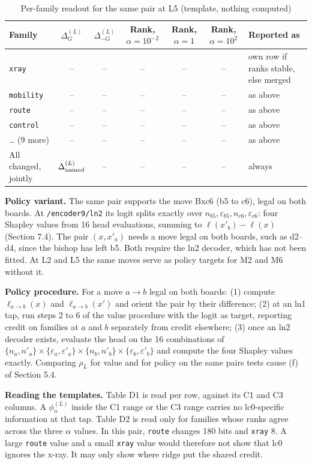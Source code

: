 \documentclass[conference]{IEEEtran}
\begin{document}
\begin{table}[H]
\centering
\renewcommand{\thetable}{D2}
\caption{Per-family readout for the same pair at L5 (template, nothing computed)}
\label{tab:D2}
\small
\begin{tabularx}{\textwidth}{lccccc>{\raggedright\arraybackslash}X}
\toprule
Family & $\Delta^{(L)}_G$ & $\Delta^{(L)}_{-G}$ & Rank, $\alpha=10^{-2}$ & Rank, $\alpha=1$ & Rank, $\alpha=10^{2}$ & Reported as \\
\midrule
\texttt{xray} & -- & -- & -- & -- & -- & own row if ranks stable, else merged \\
\texttt{mobility} & -- & -- & -- & -- & -- & as above \\
\texttt{route} & -- & -- & -- & -- & -- & as above \\
\texttt{control} & -- & -- & -- & -- & -- & as above \\
\ldots{} (9 more) & -- & -- & -- & -- & -- & as above \\
All changed, jointly & $\Delta^{(L)}_{\rm named}$ & -- & -- & -- & -- & always \\
\bottomrule
\end{tabularx}
\end{table}

\textbf{Policy variant.} The same pair supports the move Bxc6 (b5 to c6), legal on both boards. At \texttt{/\allowbreak{}encoder9/\allowbreak{}ln2} its logit splits exactly over $n_{b5},\varepsilon_{b5},n_{c6},\varepsilon_{c6}$: four Shapley values from 16 head evaluations, summing to $\ell(x'_b)-\ell(x)$ (Section 7.4). The pair $(x,x'_a)$ needs a move legal on both boards, such as d2--d4, since the bishop has left b5. Both require the ln2 decoder, which has not been fitted. At L2 and L5 the same moves serve as policy targets for M2 and M6 without it.

\textbf{Policy procedure.} For a move $a\to b$ legal on both boards: (1) compute $\ell_{a\to b}(x)$ and $\ell_{a\to b}(x')$ and orient the pair by their difference; (2) at an ln1 tap, run steps 2 to 6 of the value procedure with the logit as target, reporting credit on families at $a$ and $b$ separately from credit elsewhere; (3) once an ln2 decoder exists, evaluate the head on the 16 combinations of $\{n_a,n'_a\}\times\{\varepsilon_a,\varepsilon'_a\}\times\{n_b,n'_b\}\times\{\varepsilon_b,\varepsilon'_b\}$ and compute the four Shapley values exactly. Comparing $\rho_L$ for value and for policy on the same pairs tests cause (f) of Section 5.4.

\textbf{Reading the templates.} Table D1 is read per row, against its C1 and C3 columns. A $\phi^{(L)}_n$ inside the C1 range or the C3 range carries no lc0-specific information at that tap. Table D2 is read only for families whose ranks agree across the three $\alpha$ values. In this pair, \texttt{route} changes 180 bits and \texttt{xray} 8. A large \texttt{route} value and a small \texttt{xray} value would therefore not show that lc0 ignores the x-ray. It may only show where ridge put the shared credit.
\end{document}
